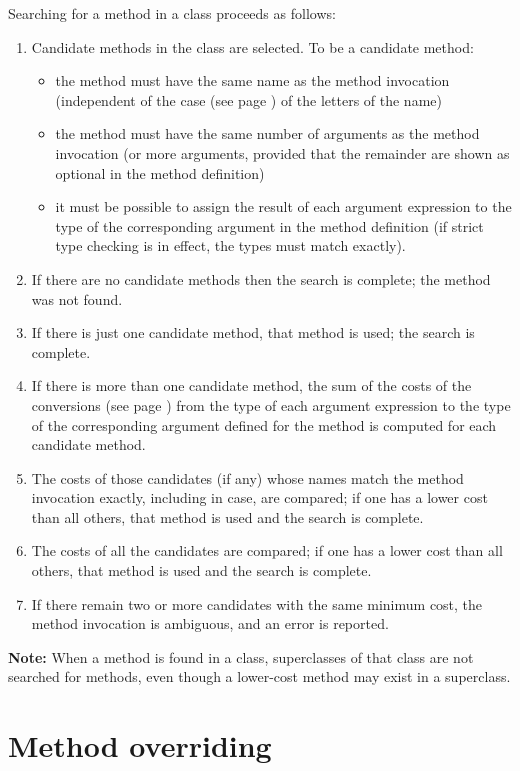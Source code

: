 Searching for a method in a class proceeds as follows:
\begin{enumerate}
\item 
Candidate methods in the class are selected.
To be a candidate method:
\begin{itemize}
\item 
the method must have the same name as the method invocation (independent
of the  case (see page \pageref{refcase})  of the letters of the name)
\item 
the method must have the same number of arguments as the method
invocation (or more arguments, provided that the remainder are shown as
optional in the method definition)
\item 
it must be possible to assign the result of each argument expression to
the type of the corresponding argument in the method definition (if
strict type checking is in effect, the types must match exactly).
\end{itemize}
\item 
If there are no candidate methods then the search is complete; the
method was not found.
\item If there is just one candidate method, that method is used; the
search is complete.
\item 
If there is more than one candidate method, the sum of the
 costs of the conversions (see page \pageref{refcosts})  from the type of each
argument expression to the type of the corresponding argument defined
for the method is computed for each candidate method.
\item 
The costs of those candidates (if any) whose names match the method
invocation exactly, including in case, are compared; if one has a lower
cost than all others, that method is used and the search is complete.
\item 
The costs of all the candidates are compared; if one has a lower
cost than all others, that method is used and the search is complete.
\item 
If there remain two or more candidates with the same minimum cost, the
method invocation is ambiguous, and an error is reported.
\end{enumerate}
\begin{shaded}\noindent
\textbf{Note: }When a method is found in a class, superclasses of that class are
not searched for methods, even though a lower-cost method may exist in a
superclass.
\end{shaded}\indent
\section{Method overriding}\label{refoverrid}
 
